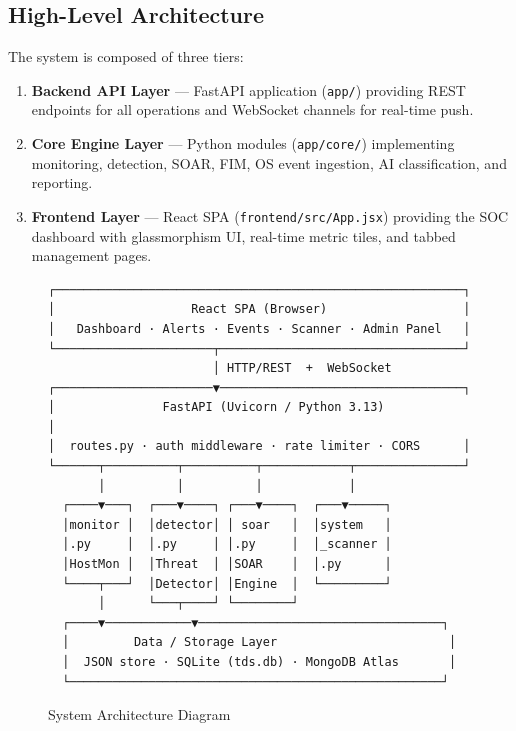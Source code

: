 \documentclass[12pt,a4paper]{article}
\begin{document}
\subsection{High-Level Architecture}

The system is composed of three tiers:

\begin{enumerate}[leftmargin=*]
    \item \textbf{Backend API Layer} — FastAPI application (\texttt{app/}) providing REST
          endpoints for all operations and WebSocket channels for real-time push.
    \item \textbf{Core Engine Layer} — Python modules (\texttt{app/core/}) implementing
          monitoring, detection, SOAR, FIM, OS event ingestion, AI classification,
          and reporting.
    \item \textbf{Frontend Layer} — React SPA (\texttt{frontend/src/App.jsx}) providing
          the SOC dashboard with glassmorphism UI, real-time metric tiles, and
          tabbed management pages.
\end{enumerate}

\begin{figure}[H]
\centering
\begin{tcolorbox}[enhanced, colback=code-bg!95!black, colframe=primary,
    arc=6pt, width=\linewidth]
\color{code-fg}\ttfamily\small
\begin{verbatim}
┌─────────────────────────────────────────────────────────┐
│                   React SPA (Browser)                   │
│   Dashboard · Alerts · Events · Scanner · Admin Panel   │
└──────────────────────┬──────────────────────────────────┘
                       │ HTTP/REST  +  WebSocket
┌──────────────────────▼──────────────────────────────────┐
│               FastAPI (Uvicorn / Python 3.13)            │
│  routes.py · auth middleware · rate limiter · CORS      │
└──────┬──────────┬──────────┬────────────┬───────────────┘
       │          │          │            │
  ┌────▼───┐  ┌───▼────┐ ┌───▼────┐  ┌───▼─────┐
  │monitor │  │detector│ │ soar   │  │system   │
  │.py     │  │.py     │ │.py     │  │_scanner │
  │HostMon │  │Threat  │ │SOAR    │  │.py      │
  └────┬───┘  │Detector│ │Engine  │  └─────────┘
       │      └───┬────┘ └────────┘
  ┌────▼────────────▼──────────────────────────────────┐
  │         Data / Storage Layer                        │
  │  JSON store · SQLite (tds.db) · MongoDB Atlas       │
  └────────────────────────────────────────────────────┘
\end{verbatim}
\end{tcolorbox}
\caption{System Architecture Diagram}
\end{figure}
\end{document}
